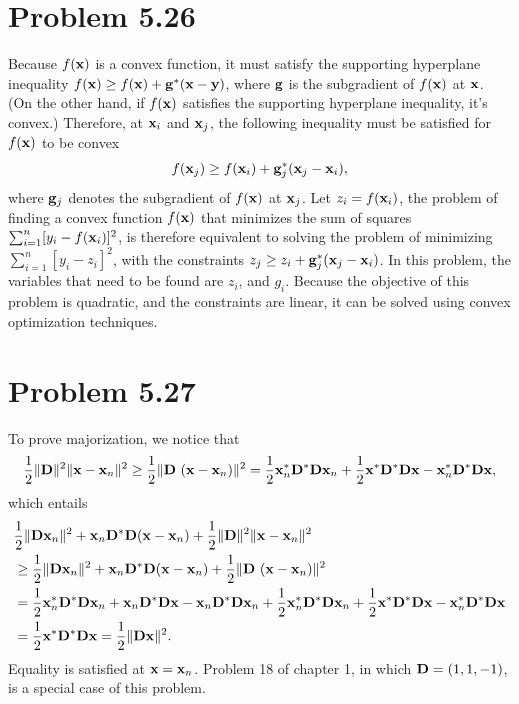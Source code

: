 \documentclass{scrartcl}
\begin{document}
\section*{Problem 5.26}

Because $f(\mathbf{x})$ is a convex function, it must satisfy the supporting hyperplane inequality
$f(\mathbf{x}) \ge f(\mathbf{x}) + \mathbf{g}^*(\mathbf{x}-\mathbf{y})$, where $\mathbf{g}$ is the subgradient of $f(\mathbf{x})$ at $\mathbf{x}$.
(On the other hand, if $f(\mathbf{x})$ satisfies the supporting hyperplane inequality, it's convex.) Therefore, at $\mathbf{x}_i$ and $\mathbf{x}_j$,
the following inequality must be satisfied for $f(\mathbf{x})$ to be convex
\begin{equation}
    f(\mathbf{x}_j) \ge f(\mathbf{x}_i)  + \mathbf{g}_j^*(\mathbf{x}_j-\mathbf{x}_i),
\end{equation}
where $\mathbf{g}_j$ denotes the subgradient of $f(\mathbf{x})$ at $\mathbf{x}_j$.
Let $z_i = f(\mathbf{x}_i)$, the problem of finding a convex function $f(\mathbf{x})$ that minimizes the sum of squares $\sum_{i=1}^n [y_i-f(\mathbf{x}_i)]^2$,
is therefore equivalent to solving the problem of minimizing $\sum_{i=1}^n [y_i-z_i]^2$, with the constraints
$z_j \ge z_i  + \mathbf{g}_j^*(\mathbf{x}_j-\mathbf{x}_i)$. In this problem, the variables that need to be found are $z_i$, and $g_i$.
Because the objective of this problem is quadratic, and the constraints are linear, it can be solved using convex optimization techniques.

\section*{Problem 5.27}

To prove majorization, we notice that
\begin{equation}
 {1 \over 2} \|\mb{D}\|^2 \|\mb{x}-\mb{x}_n\|^2 \ge {1 \over 2} \|\mb{D}\ (\mb{x}-\mb{x}_n) \|^2
 = {1 \over 2} \mb{x}_n^* \mb{D}^* \mb{D} \mb{x}_n + {1 \over 2} \mb{x}^* \mb{D}^* \mb{D} \mb{x} - \mb{x}_n^* \mb{D}^* \mb{D} \mb{x} ,
\end{equation}
which entails
\begin{equation}
\begin{split}
& {1 \over 2} \|\mb{D}\mb{x}_n\|^2 + \mb{x}_n\mb{D}^*\mb{D}(\mb{x}-\mb{x}_n) +  {1 \over 2} \|\mb{D}\|^2 \|\mb{x}-\mb{x}_n\|^2 \\
& \ge {1 \over 2} \|\mb{D}\mb{x}_n\|^2 + \mb{x}_n\mb{D}^*\mb{D}(\mb{x}-\mb{x}_n)  + {1 \over 2} \|\mb{D}\ (\mb{x}-\mb{x}_n) \|^2 \\
& = {1 \over 2} \mb{x}_n^* \mb{D}^* \mb{D} \mb{x}_n +  \mb{x}_n\mb{D}^*\mb{D}\mb{x} - \mb{x}_n\mb{D}^*\mb{D}\mb{x}_n + 
{1 \over 2} \mb{x}_n^* \mb{D}^* \mb{D} \mb{x}_n + {1 \over 2} \mb{x}^* \mb{D}^* \mb{D} \mb{x} - \mb{x}_n^* \mb{D}^* \mb{D} \mb{x} \\
& = {1 \over 2} \mb{x}^* \mb{D}^* \mb{D} \mb{x} = {1 \over 2} \| \mb{D} \mb{x} \|^2.
\end{split}
\end{equation}
Equality is satisfied at $\mathbf{x} = \mathbf{x}_n$. 
Problem 18 of chapter 1, in which $\mathbf{D} = (1, 1, -1)$, is a special case of this problem.
\end{document}
